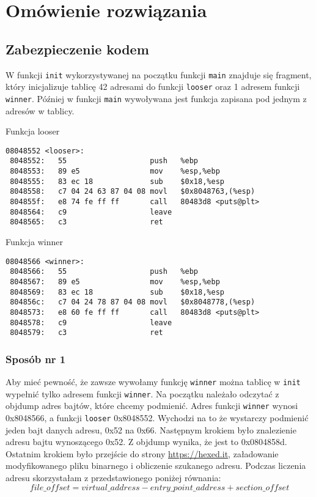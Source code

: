 \documentclass[12pt,a4paper,titlepage]{article}
\begin{document}
\section{Omówienie rozwiązania}
\subsection{Zabezpieczenie kodem}
W funkcji \texttt{init} wykorzystywanej na początku funkcji \texttt{main} znajduje się fragment, który inicjalizuje tablicę 42 adresami do funkcji \texttt{looser} oraz 1 adresem funkcji \texttt{winner}. Później w funkcji \texttt{main} wywoływana jest funkcja zapisana pod jednym z adresów w tablicy.

\begin{listing}[H]
\caption{Funkcja looser}
\begin{verbatim}
08048552 <looser>:
 8048552:	55                   push   %ebp
 8048553:	89 e5                mov    %esp,%ebp
 8048555:	83 ec 18             sub    $0x18,%esp
 8048558:	c7 04 24 63 87 04 08 movl   $0x8048763,(%esp)
 804855f:	e8 74 fe ff ff       call   80483d8 <puts@plt>
 8048564:	c9                   leave
 8048565:	c3                   ret
\end{verbatim}
\end{listing}

\begin{listing}[H]
\caption{Funkcja winner}
\begin{verbatim}
08048566 <winner>:
 8048566:	55                   push   %ebp
 8048567:	89 e5                mov    %esp,%ebp
 8048569:	83 ec 18             sub    $0x18,%esp
 804856c:	c7 04 24 78 87 04 08 movl   $0x8048778,(%esp)
 8048573:	e8 60 fe ff ff       call   80483d8 <puts@plt>
 8048578:	c9                   leave
 8048579:	c3                   ret
\end{verbatim}
\end{listing}

\subsubsection{Sposób nr 1}
 Aby mieć pewność, że zawsze wywołamy funkcję \texttt{winner} można tablicę w \texttt{init} wypełnić tylko adresem funkcji \texttt{winner}. Na początku należało odczytać z objdump adres bajtów, które chcemy podmienić. Adres funkcji \texttt{winner} wynosi 0x8048566, a funkcji \texttt{looser} 0x8048552. Wychodzi na to że wystarczy podmienić jeden bajt danych adresu, 0x52 na 0x66. Następnym krokiem było znalezienie adresu bajtu wynoszącego 0x52. Z objdump wynika, że jest to 0x0804858d. Ostatnim krokiem było przejście do strony \url{https://hexed.it}, załadowanie modyfikowanego pliku binarnego i obliczenie szukanego adresu. Podczas liczenia adresu skorzystałam z przedstawionego poniżej równania:
\begin{equation*}
    file\_offset = virtual\_address - entry\_point\_address + section\_offset
\end{equation*}
\end{document}
